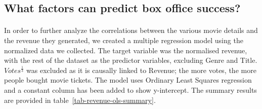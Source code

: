     \subsection{What factors can predict box office success?}
        \paragraph{}
            In order to further analyze the correlations between the various movie details
                and the revenue they generated, we created a multiple regression model using
                the normalized data we collected.
            The target variable was the normalised revenue, with the rest of the dataset as
                the predictor variables, excluding Genre and Title.
            $Votes^\frac{1}{3}$ was excluded as it is causally linked to Revenue; the more votes, the more people bought movie tickets.
            The model uses Ordinary Least Squares regression and a constant column has been
                added to show y-intercept.
            The summary results are provided in table~\ref{tab-revenue-ols-summary}.
